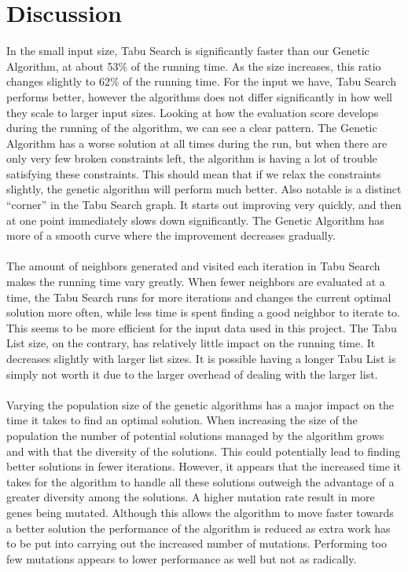 \documentclass[titlepage,a4paper]{article}
\begin{document}
\pagebreak
\section{Discussion}
In the small input size, Tabu Search is significantly faster than our Genetic Algorithm, at about 53\% of the running time. As the size increases, this ratio changes slightly to 62\% of the running time. For the input we have, Tabu Search performs better, however the algorithms does not differ significantly in how well they scale to larger input sizes. Looking at how the evaluation score develops during the running of the algorithm, we can see a clear pattern. The Genetic Algorithm has a worse solution at all times during the run, but when there are only very few broken constraints left, the algorithm is having a lot of trouble satisfying these constraints. This should mean that if we relax the constraints slightly, the genetic algorithm will perform much better. Also notable is a distinct ``corner'' in the Tabu Search graph. It starts out improving very quickly, and then at one point immediately slows down significantly. The Genetic Algorithm has more of a smooth curve where the improvement decreases gradually.
 \\\\
The amount of neighbors generated and visited each iteration in Tabu Search makes the running time vary greatly. When fewer neighbors are evaluated at a time, the Tabu Search runs for more iterations and changes the current optimal solution more often, while less time is spent finding a good neighbor to iterate to. This seems to be more efficient for the input data used in this project.
The Tabu List size, on the contrary, has relatively little impact on the running time. It decreases slightly with larger list sizes. It is possible having a longer Tabu List is simply not worth it due to the larger overhead of dealing with the larger list. \\\\
Varying the population size of the genetic algorithms has a major impact on the time it takes to find an optimal solution. When increasing the size of the population the number of potential solutions managed by the algorithm grows and with that the diversity of the solutions. This could potentially lead to finding better solutions in fewer iterations. However, it appears that the increased time it takes for the algorithm to handle all these solutions outweigh the advantage of a greater diversity among the solutions.
A higher mutation rate result in more genes being mutated. Although this allows the algorithm to move faster towards a better solution the performance of the algorithm is reduced as extra work has to be put into carrying out the increased number of mutations. Performing too few mutations appears to lower performance as well but not as radically.
\end{document}
